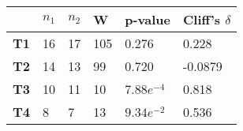 \begin{tabular}{llllll}
    \hline
                & \textbf{$n_1$} & \textbf{$n_2$} & \textbf{W} & \textbf{p-value} & \textbf{Cliff's $\delta$} \\
    \hline
    \textbf{T1} & 16             & 17             & 105        & 0.276            & 0.228                     \\
    \textbf{T2} & 14             & 13             & 99         & 0.720            & -0.0879                   \\
    \textbf{T3} & 10             & 11             & 10         & $7.88e^{-4}$     & 0.818                     \\
    \textbf{T4} & 8              & 7              & 13         & $9.34e^{-2}$     & 0.536                     \\
    \hline
\end{tabular}